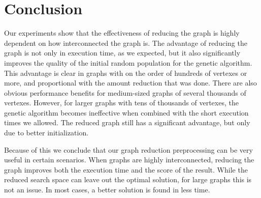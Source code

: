 \section{Conclusion}
\label{sec:conclusion}
Our experiments show that the effectiveness of reducing the graph is highly dependent on how interconnected the graph is. The advantage of reducing the graph is not only in execution time, as we expected, but it also significantly improves the quality of the initial random population for the genetic algorithm. This advantage is clear in graphs with on the order of hundreds of vertexes or more, and proportional with the amount reduction that was done. There are also obvious performance benefits for medium-sized graphs of several thousands of vertexes. However, for larger graphs with tens of thousands of vertexes, the genetic algorithm becomes ineffective when combined with the short execution times we allowed. The reduced graph still has a significant advantage, but only due to better initialization.
\par
Because of this we conclude that our graph reduction preprocessing can be very useful in certain scenarios. When graphs are highly interconnected, reducing the graph improves both the execution time and the score of the result. While the reduced search space can leave out the optimal solution, for large graphs this is not an issue. In most cases, a better solution is found in less time.